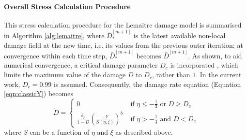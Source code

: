 \documentclass[sn-mathphys,Numbered,draft]{sn-jnl}%
\begin{document}


\paragraph{Overall Stress Calculation Procedure}

This stress calculation procedure for the Lemaitre damage model is summarised in Algorithm \ref{alg:lemaitre}, where $\bar{D}^{[m+1]}_*$ is the latest available non-local damage field at the new time, i.e. its values from the previous outer iteration; at convergence within each time step, $\bar{D}^{[m+1]}_*$ becomes $\bar{D}^{[m+1]}$.
As shown, to aid numerical convergence, a critical damage parameter $D_c$ is incorporated \cite{lemaitre_continuous_1985}, which limits the maximum value of the damage $D$ to $D_c$, rather than $1$.
In the current work, $D_c = 0.99$ is assumed.
Consequently, the damage rate equation (Equation \ref{eqn:classicY}) becomes
\begin{equation} \label{eq:damageLimit} %
	\dot{D} =
	\begin{cases}
		0 & \text { if } \eta \leq -\frac{1}{3} \text{ or } D \geq D_c \\
		\frac{\dot{\bar{\varepsilon}}_p}{1 - D}\left(\frac{-Y}{S(\eta,\xi)}\right)^b 
		& \text { if } \eta>-\frac{1}{3} \text{ and }  D < D_c
	\end{cases}
\end{equation}
where $S$ can be a function of $\eta$ and $\xi$ as described above.
\end{document}

